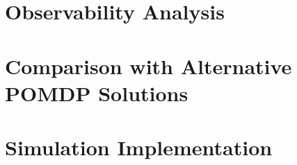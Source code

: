 \section{Observability Analysis}\label{sec:observability}

%
%
%
%
%
%
%
%
%

\section{Comparison with Alternative POMDP Solutions}\label{sec:pomdp_comparison}


\section{Simulation Implementation}\label{sec:sim_implementation}


